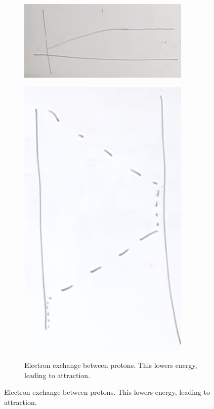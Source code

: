 \documentclass[]{article}
\begin{document}
\begin{figure}[H]
\begin{subfigure}{0.45\textwidth}
		\includegraphics[width=0.9\textwidth]{2proton1ElectronEnergy}\label{fig:2proton1ElectronEnergy}
	\end{subfigure}
	\begin{subfigure}{0.45\textwidth}
		\caption{Electron exchange between protons. This lowers energy, leading to attraction.}
		\includegraphics[width=0.9\textwidth]{2proton1ElectronHopping}\label{fig:2proton1ElectronHopping}
	\end{subfigure}
\end{figure}
\end{document}

